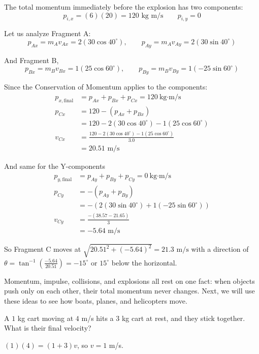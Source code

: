 \begin{Answer}[ref=three_fragment_projectile]
The total momentum immediately before the explosion has two components:
\[p_{i,x} = (6)(20) = 120 \text{ kg m/s} \qquad p_{i,y} = 0\]

Let us analyze Fragment A:
$$p_{Ax} = m_A v_{Ax} = 2(30\cos 40^\circ), \qquad p_{Ay} = m_A v_{Ay} = 2(30\sin 40^\circ)$$

And Fragment B,
$$p_{Bx} = m_B v_{Bx} = 1(25\cos 60^\circ), \qquad p_{By} = m_B v_{By} = 1(-25\sin 60^\circ)$$

Since the Conservation of Momentum applies to the components:
\begin{align*}
  p_{x,\text{final}} &= p_{Ax} + p_{Bx} + p_{Cx} = 120\ \text{kg·m/s}\\
  p_{Cx} &= 120 - (p_{Ax} + p_{Bx}) \\
  &= 120 - 2(30\cos 40^\circ) - 1(25\cos 60^\circ) \\
  v_{Cx} &= \frac{120 - 2(30\cos 40^\circ) - 1(25\cos 60^\circ)}{3.0} \\ 
  &= 20.51 \text{ m/s}
\end{align*}

And same for the Y-components
\begin{align*}
  p_{y,\text{final}} &= p_{Ay} + p_{By} + p_{Cy} = 0\ \text{kg·m/s}\\
  p_{Cy} &= - (p_{Ay} + p_{By}) \\
   &= -(2(30\sin 40^\circ) + 1(-25\sin 60^\circ)) \\
  v_{Cy}&= \frac{-(38.57 - 21.65)}{3} \\ 
  &= -5.64 \text{ m/s}
\end{align*}

So Fragment C moves at $\sqrt{20.51^2 + (-5.64)^2} = 21.3 \text{ m/s}$ with a direction of $\theta=\tan^{-1}\left(\frac{-5.64}{20.51}\right) = -15^\circ$ or $15^\circ$ below the horizontal.
\end{Answer}

Momentum, impulse, collisions, and explosions all rest on one fact: when
objects push only on each other, their total momentum never changes. Next,
we will use these ideas to see how boats, planes, and helicopters move.

\begin{Exercise}[title={Sticking Together}, label=mom1]
A $1$ kg cart moving at $4$ m/s hits a $3$ kg cart at rest, and they stick together. What is their final velocity?
\end{Exercise}
\begin{Answer}[ref=mom1]
$(1)(4) = (1 + 3)v$, so $v = 1$ m/s.
\end{Answer}
